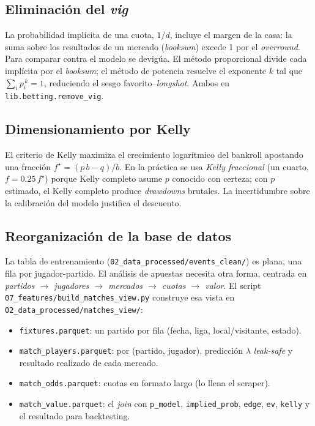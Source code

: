 \subsection{Eliminación del \emph{vig}}

La probabilidad implícita de una cuota, $1/d$, incluye el margen de la casa: la
suma sobre los resultados de un mercado (\emph{booksum}) excede 1 por el
\emph{overround}. Para comparar contra el modelo se devig\'ua. El método
proporcional divide cada implícita por el \emph{booksum}; el método de potencia
resuelve el exponente $k$ tal que $\sum_i p_i^{\,k} = 1$, reduciendo el sesgo
favorito--\emph{longshot}. Ambos en \texttt{lib.betting.remove\_vig}.

\subsection{Dimensionamiento por Kelly}

El criterio de Kelly maximiza el crecimiento logarítmico del bankroll apostando
una fracción $f^\star = (p\,b - q)/b$. En la práctica se usa \emph{Kelly
fraccional} (un cuarto, $f = 0.25\,f^\star$) porque Kelly completo asume $p$
conocido con certeza; con $p$ estimado, el Kelly completo produce \emph{drawdowns}
brutales. La incertidumbre sobre la calibración del modelo justifica el
descuento.

\subsection{Reorganización de la base de datos}

La tabla de entrenamiento (\texttt{02\_data\_processed/events\_clean/}) es plana,
una fila por jugador-partido. El análisis de apuestas necesita otra forma,
centrada en \emph{partidos $\to$ jugadores $\to$ mercados $\to$ cuotas $\to$
valor}. El script \texttt{07\_features/build\_matches\_view.py} construye esa vista
en \texttt{02\_data\_processed/matches\_view/}:

\begin{itemize}[noitemsep]
  \item \texttt{fixtures.parquet}: un partido por fila (fecha, liga, local/visitante, estado).
  \item \texttt{match\_players.parquet}: por (partido, jugador), predicción
  $\lambda$ \emph{leak-safe} y resultado realizado de cada mercado.
  \item \texttt{match\_odds.parquet}: cuotas en formato largo (lo llena el scraper).
  \item \texttt{match\_value.parquet}: el \emph{join} con \texttt{p\_model},
  \texttt{implied\_prob}, \texttt{edge}, \texttt{ev}, \texttt{kelly} y el resultado
  para backtesting.
\end{itemize}

